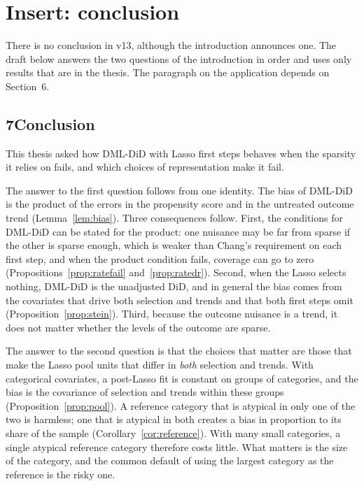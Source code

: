 \documentclass[11pt]{article}
\newcommand{\where}[1]{\par\medskip\noindent{\small\textcolor{black!60}{\textsf{\textbf{Where:} #1}}}\par\nopagebreak\smallskip}
\newenvironment{ins}{\begin{leftbar}}{\end{leftbar}}
\theoremstyle{plain}
\theoremstyle{remark}
\begin{document}
\section{Insert: conclusion}\label{sec:concl-ins}

There is no conclusion in v13, although the introduction announces one. The
draft below answers the two questions of the introduction in order and uses
only results that are in the thesis. The paragraph on the application depends on
Section~6.

\where{New Section~7.}
\begin{ins}
\section*{7\quad Conclusion}

This thesis asked how DML-DiD with Lasso first steps behaves when the sparsity
it relies on fails, and which choices of representation make it fail.

The answer to the first question follows from one identity. The bias of DML-DiD
is the product of the errors in the propensity score and in the untreated
outcome trend (Lemma~\ref{lem:bias}). Three consequences follow. First, the
conditions for DML-DiD can be stated for the product: one nuisance may be far
from sparse if the other is sparse enough, which is weaker than Chang's
requirement on each first step, and when the product condition fails, coverage
can go to zero (Propositions~\ref{prop:ratefail} and~\ref{prop:ratedr}). Second,
when the Lasso selects nothing, DML-DiD is the unadjusted DiD, and in general
the bias comes from the covariates that drive both selection and trends and that
both first steps omit (Proposition~\ref{prop:stein}). Third, because the outcome
nuisance is a trend, it does not matter whether the levels of the outcome are
sparse.

The answer to the second question is that the choices that matter are those
that make the Lasso pool units that differ in \emph{both} selection and trends.
With categorical covariates, a post-Lasso fit is constant on groups of
categories, and the bias is the covariance of selection and trends within these
groups (Proposition~\ref{prop:pool}). A reference category that is atypical in
only one of the two is harmless; one that is atypical in both creates a bias in
proportion to its share of the sample (Corollary~\ref{cor:reference}). With
many small categories, a single atypical reference category therefore costs
little. What matters is the size of the category, and the common default of
using the largest category as the reference is the risky one.


\end{ins}
\end{document}
